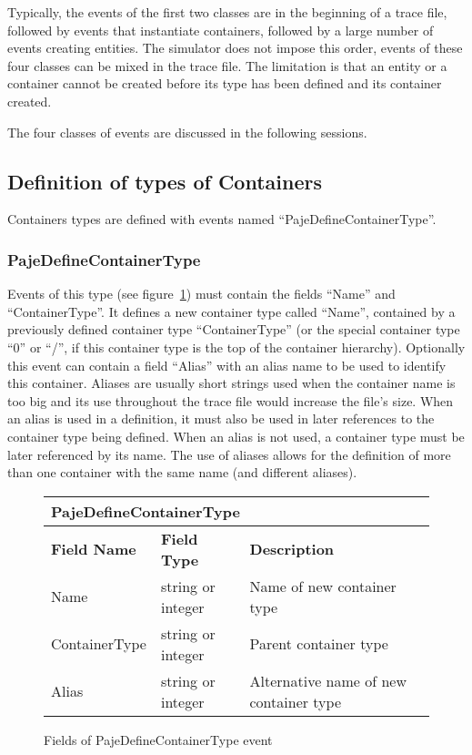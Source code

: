 Typically, the events of the first two classes are in the beginning of a trace
file, followed by events that instantiate containers, followed by a large number of events creating entities.
The simulator does
not impose this order, events of these four classes can be mixed in the trace
file. The limitation is that an entity or a container cannot be created before
its type has been defined and its container created.

The four classes of events are discussed in the following sessions.

\subsection{Definition of types of Containers}
\label{sec:contype}

Containers types are defined with events named ``PajeDefineContainerType''.

\subsubsection*{PajeDefineContainerType}

Events of this type (see figure~\ref{f:pajedefinecontainertype}) must contain the fields  ``Name'' and ``ContainerType''.
It defines a new container type called ``Name'', contained by a previously
defined container type ``ContainerType'' (or the special container type ``0'' or
``/'', if this container type is
the top of the container hierarchy).
Optionally this event can contain a field ``Alias'' with an alias name to be
used to identify this container. Aliases are usually short strings used when the
container name is too big and its use throughout the trace file would increase
the file's size.
When an alias is used in a definition, it must also be used in later references to the container type being defined.
When an alias is not used, a container type must be later referenced by its name.
The use of aliases allows for the definition of more than one container with the same name (and different aliases).

\begin{figure}[htbp]
\begin{center}
\begin{tabular}{|LLL|}
\hline
{}\\\hline
\textbf{Field Name} & \textbf{Field Type} & \textbf{Description}\\
\hline
Name          & string or integer & Name of new container type\\
ContainerType & string or integer & Parent container type\\
\hline
Alias         & string or integer & Alternative name of new container type\\
\hline
\end{tabular}%
\end{center}%
\caption{Fields of PajeDefineContainerType event}
\label{f:pajedefinecontainertype}
\end{figure}

